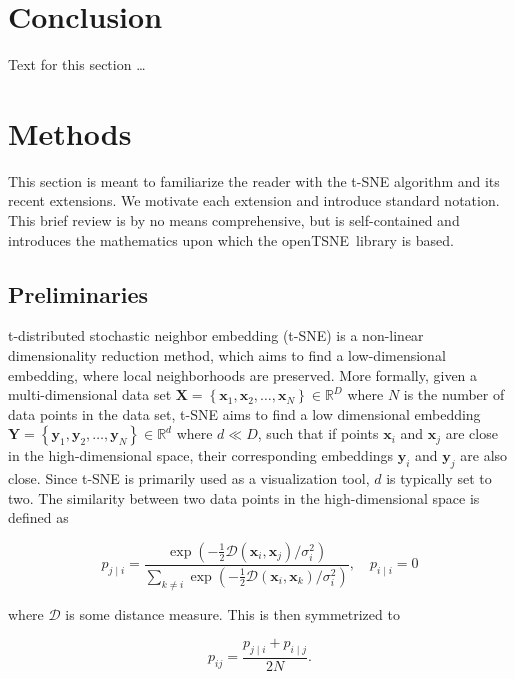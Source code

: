 \documentclass[letter]{article}
\newcommand{\opentsne}{\textsf{openTSNE}}
\begin{document}
\section*{Conclusion}
Text for this section \ldots


\fontsize{8}{10}\selectfont
\section*{Methods}

This section is meant to familiarize the reader with the t-SNE algorithm and its
recent extensions. We motivate each extension and introduce standard notation.
This brief review is by no means comprehensive, but is self-contained and
introduces the mathematics upon which the \opentsne\ library is based.

\subsection*{Preliminaries}

t-distributed stochastic neighbor embedding (t-SNE) is a non-linear
dimensionality reduction method, which aims to find a low-dimensional
embedding, where local neighborhoods are preserved. More formally, given a
multi-dimensional data set $\mathbf{X} = \left \{ \mathbf{x}_1, \mathbf{x}_2,
\dots, \mathbf{x}_N \right \} \in \mathbb{R}^D$ where $N$ is the number of data
points in the data set, t-SNE aims to find a low dimensional embedding
$\mathbf{Y} = \left \{ \mathbf{y}_1, \mathbf{y}_2, \dots, \mathbf{y}_N \right
\} \in \mathbb{R}^d$ where $d \ll D$, such that if points $\mathbf{x}_i$ and
$\mathbf{x}_j$ are close in the high-dimensional space, their corresponding
embeddings $\mathbf{y}_i$ and $\mathbf{y}_j$ are also close. Since t-SNE is
primarily used as a visualization tool, $d$ is typically set to two. The
similarity between two data points in the high-dimensional space is defined as

\begin{equation}
p_{j \mid i} = \frac{\exp \left ( -\frac{1}{2} \mathcal{D}(\mathbf{x}_i, \mathbf{x}_j ) / \sigma_i^2 \right )}
{\sum_{k \neq i } \exp \left ( -\frac{1}{2} \mathcal{D}(\mathbf{x}_i, \mathbf{x}_k ) / \sigma_i^2 \right )}, \quad p_{i \mid i} = 0
\label{eq:gaussian_kernel}
\end{equation}

\noindent where $\mathcal{D}$ is some distance measure. This is then
symmetrized to

\begin{equation}
p_{ij} = \frac{p_{j \mid i} + p_{i \mid j}}{2N}.
\label{eq:symmetrize}
\end{equation}
\end{document}
